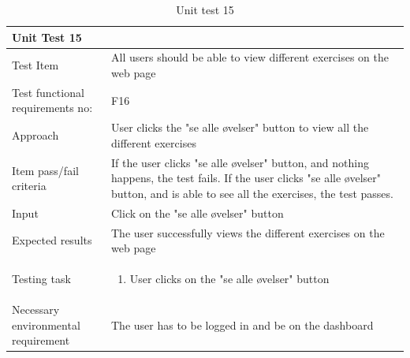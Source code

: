 \begin{table}[H]
\begin{tabular}{ | L{0.25\linewidth} | L{0.75\linewidth} | } 
 \hline {}
 Unit Test 15 &  \\
 \hline
 Test Item & All users should be able to view different exercises on the web page\\
 \hline
 Test functional requirements no: & F16
 \\
 \hline
 Approach & User clicks the "se alle øvelser" button to view all the different exercises\\
  \hline
 Item pass/fail criteria & If the user clicks "se alle øvelser" button, and nothing happens, the test fails. If the user clicks "se alle øvelser" button, and is able to see all the exercises, the test passes.\\
 \hline
 Input & Click on the "se alle øvelser" button\\ 
 \hline
 Expected results & The user successfully views the different exercises on the web page\\
  \hline
Testing task &
    \vspace{-5mm}
    \begin{enumerate}[noitemsep]
  \item User clicks on the "se alle øvelser" button
   \end{enumerate}\\
 \hline
 Necessary environmental requirement & The user has to be logged in and be on the dashboard\\
 \hline
\end{tabular}
\caption{Unit test 15}
\end{table}

